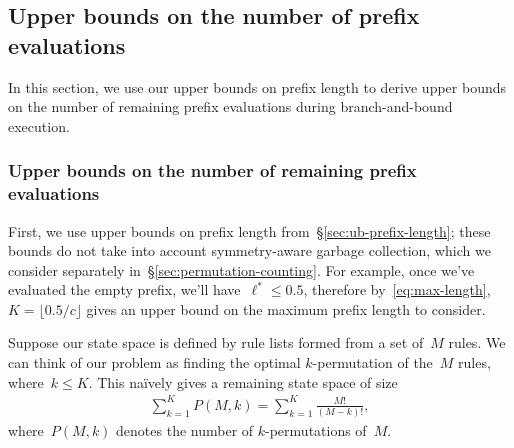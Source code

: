 



\subsection{Upper bounds on the number of prefix evaluations}

In this section, we use our upper bounds on prefix length to derive upper bounds on
the number of remaining prefix evaluations during branch-and-bound execution.

\subsubsection{Upper bounds on the number of remaining prefix evaluations}
\label{sec:ub-size}

First, we use upper bounds on prefix length from~\S\ref{sec:ub-prefix-length};
these bounds do not take into account symmetry-aware garbage collection,
which we consider separately in~\S\ref{sec:permutation-counting}.
%
For example, once we've evaluated the empty prefix, we'll have~${\ell^* \le 0.5}$,
therefore by~\eqref{eq:max-length}, ${K = \lfloor 0.5 / c \rfloor}$ gives
an upper bound on the maximum prefix length to consider.

Suppose our state space is defined by rule lists formed from a set of~$M$ rules.
%
We can think of our problem as finding the optimal $k$-permutation of the~$M$ rules,
where~${k \le K}$.
%
This na\"ively gives a remaining state space of size
\begin{align}
\sum_{k=1}^K P(M, k) = \sum_{k=1}^K \frac{M!}{(M - k)!},
\label{eq:size-naive}
\end{align}
where~${P(M, k)}$ denotes the number of $k$-permutations of~$M$.

